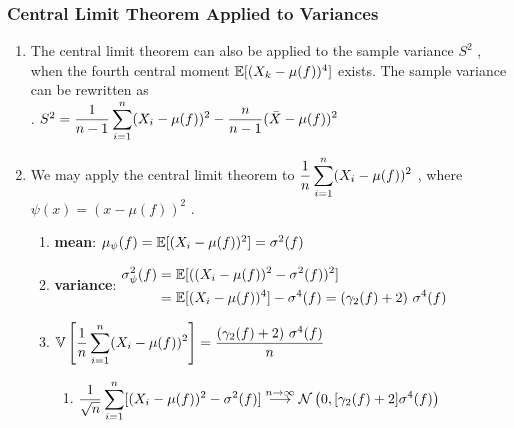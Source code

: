 \subsubsection{Central Limit Theorem Applied to Variances}

\begin{enumerate}
    \item The central limit theorem can also be applied to the sample variance $S^2$ , when the fourth central moment $\mathbb{E}[(X _k - \mu( f ))^4]$ exists.
    The sample variance can be rewritten as
    \hfill \cite{statistics/book/Statistics-for-Data-Scientists/Maurits-Kaptein}
    \\
    .\hfill
    $
        S^2 = \dfrac{1}{n - 1} \displaystyle\sum^n _{i=1} (X _i - \mu( f ))^2 - \dfrac{n}{n - 1} (\bar{X} - \mu( f ))^2
    $
    \hfill \cite{statistics/book/Statistics-for-Data-Scientists/Maurits-Kaptein}

    \item We may apply the central limit theorem to $\dfrac{1}{ n} \displaystyle\sum ^n _{i=1} (X_ i - \mu  ( f ))^2$ , where $\psi(x) = (x - \mu ( f ))^2$ .
    \hfill \cite{statistics/book/Statistics-for-Data-Scientists/Maurits-Kaptein}
    \begin{enumerate}
        \item \textbf{mean}: $\mu _\psi ( f ) = \mathbb{E}[(X _i - \mu ( f ))^2] = \sigma ^2( f )$
        \hfill \cite{statistics/book/Statistics-for-Data-Scientists/Maurits-Kaptein}

        \item \textbf{variance}:
        $
            \begin{aligned}
                \sigma  ^2 _\psi ( f )
                &= \mathbb{E}[((X _i - \mu ( f ))^2 - \sigma ^ 2( f ))^2 ] \\
                &= \mathbb{E}[(X _i - \mu ( f ))^4] - \sigma ^ 4( f )
                = (\gamma_2( f ) + 2)\ \sigma  ^4( f )
            \end{aligned}
        $
        \hfill \cite{statistics/book/Statistics-for-Data-Scientists/Maurits-Kaptein}

        \item
        $
            \mathbb{V}\left[\dfrac{1}{n} \displaystyle\sum^n _{i=1}(X _i - \mu ( f ))^2\right]
            = \dfrac{(\gamma_2( f ) + 2)\ \sigma^ 4( f )}{n}
        $
        \hfill \cite{statistics/book/Statistics-for-Data-Scientists/Maurits-Kaptein}
        \begin{enumerate}
            \item
            $
                \dfrac{1}{\sqrt{n}} \displaystyle\sum^n _{i=1} [(X _i - \mu ( f ))^2 - \sigma ^2( f )]
                \overset{n \to \infty}{\longrightarrow}
                \mathcal{N}\left(0,  [\gamma_2( f ) + 2]\sigma ^4( f )\right)
            $
            \hfill \cite{statistics/book/Statistics-for-Data-Scientists/Maurits-Kaptein}


\end{enumerate}
\end{enumerate}
\end{enumerate}
